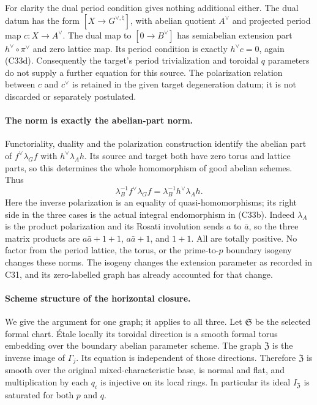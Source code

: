 For clarity the dual period condition gives nothing
additional either. The dual datum has the form
$[X\to G^{\vee,\natural}]$, with abelian quotient
$A^\vee$ and projected period map $c:X\to A^\vee$.
The dual map to $[0\to B^\vee]$ has semiabelian
extension part $h^\vee\circ\pi^\vee$ and zero lattice
map. Its period condition is exactly $h^\vee c=0$,
again (C33d). Consequently the target's period
trivialization and toroidal $q$ parameters do not
supply a further equation for this source. The
polarization relation between $c$ and $c^\vee$ is
retained in the given target degeneration datum;
it is not discarded or separately postulated.

\paragraph{The norm is exactly the abelian-part norm.}
Functoriality, duality and the polarization construction
identify the abelian part of $f^\vee\lambda_G f$ with
$h^\vee\lambda_Ah$. Its source and target both have
zero torus and lattice parts, so this determines the
whole homomorphism of good abelian schemes. Thus
\[
       \lambda_B^{-1}f^\vee\lambda_Gf
          =\lambda_B^{-1}h^\vee\lambda_Ah.              \tag{C33e}
\]
Here the inverse polarization is an equality of
quasi-homomorphisms; its right side in the three
cases is the actual integral endomorphism in
(C33b). Indeed $\lambda_A$ is the product
polarization and its Rosati involution sends
$a$ to $\bar a$, so the three matrix products
are $a\bar a+1+1$, $a\bar a+1$, and $1+1$.
All are totally positive. No factor from the
period lattice, the torus, or the prime-to-$p$
boundary isogeny changes these norms. The
isogeny changes the extension parameter as
recorded in C31, and its zero-labelled graph
has already accounted for that change.

\paragraph{Scheme structure of the horizontal closure.}
We give the argument for one graph; it applies to
all three. Let $\mathfrak S$ be the selected formal
chart. \'Etale locally its toroidal direction is a
smooth formal torus embedding over the boundary
abelian parameter scheme. The graph $\mathfrak Z$
is the inverse image of $\Gamma_j$. Its equation
is independent of those directions. Therefore
$\mathfrak Z$ is smooth over the original
mixed-characteristic base, is normal and flat,
and multiplication by each $q_i$ is injective
on its local rings. In particular its ideal
$I_{\mathfrak Z}$ is saturated for both $p$
and $q$.

